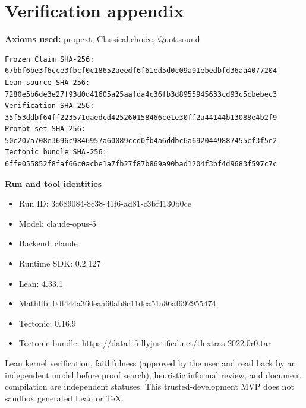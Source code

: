 \documentclass[11pt]{article}
\begin{document}
\section*{Verification appendix}
\textbf{Axioms used:} propext, Classical.choice, Quot.sound

\begin{Verbatim}[fontsize=\small]
Frozen Claim SHA-256: 67bbf6be3f6cce3fbcf0c18652aeedf6f61ed5d0c09a91ebedbfd36aa4077204
Lean source SHA-256: 7280e5b6de3e27f93d0d41605a25aafda4c36fb3d8955945633cd93c5cbebec3
Verification SHA-256: 35f53ddbf64ff223571daedcd425260158466ce1e30ff2a44144b13088e4b2f9
Prompt set SHA-256: 50c207a708e3696c9846957a60089ccd0fb4a6ddbc6a6920449887455cf3f5e2
Tectonic bundle SHA-256: 6ffe055852f8faf66c0acbe1a7fb27f87b869a90bad1204f3bf4d9683f597c7c
\end{Verbatim}

\begin{samepage}
\textbf{Run and tool identities}
\begin{itemize}
\item Run ID: 3c689084-8c38-41f6-ad81-c3bf4130b0ce
\item Model: claude-opus-5
\item Backend: claude
\item Runtime SDK: 0.2.127
\item Lean: 4.33.1
\item Mathlib: 0df444a360eaa60ab8c11dca51a86af692955474
\item Tectonic: 0.16.9
\item Tectonic bundle: https://data1.fullyjustified.net/tlextras-2022.0r0.tar
\end{itemize}
\end{samepage}

\vfill
\small
Lean kernel verification, faithfulness (approved by the user and read back by an
independent model before proof search), heuristic informal review, and document
compilation are independent statuses. This trusted-development MVP
does not sandbox generated Lean or TeX.
\end{document}
